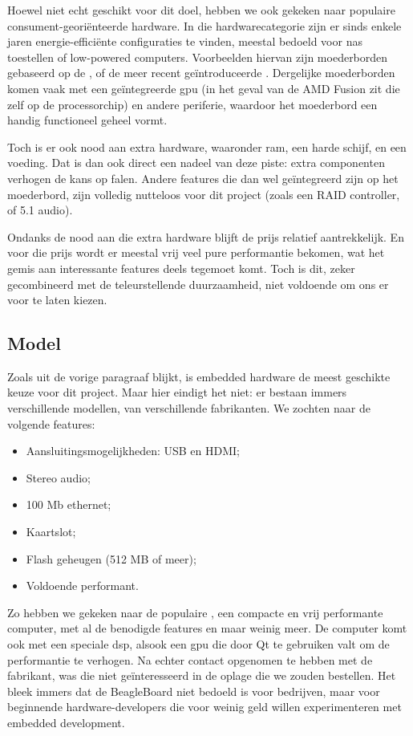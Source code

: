 Hoewel niet echt geschikt voor dit doel, hebben we ook gekeken naar populaire consument-georiënteerde hardware. In die hardwarecategorie zijn er sinds enkele jaren energie-efficiënte configuraties te vinden, meestal bedoeld voor \ac{nas} toestellen of low-powered computers. Voorbeelden hiervan zijn moederborden gebaseerd op de , of de meer recent geïntroduceerde . Dergelijke moederborden komen vaak met een geïntegreerde \ac{gpu} (in het geval van de AMD Fusion zit die zelf op de processorchip) en andere periferie, waardoor het moederbord een handig functioneel geheel vormt.

Toch is er ook nood aan extra hardware, waaronder \ac{ram}, een harde schijf, en een voeding. Dat is dan ook direct een nadeel van deze piste: extra componenten verhogen de kans op falen. Andere features die dan wel geïntegreerd zijn op het moederbord, zijn volledig nutteloos voor dit project (zoals een RAID controller, of 5.1 audio).

Ondanks de nood aan die extra hardware blijft de prijs relatief aantrekkelijk. En voor die prijs wordt er meestal vrij veel pure performantie bekomen, wat het gemis aan interessante features deels tegemoet komt. Toch is dit, zeker gecombineerd met de teleurstellende duurzaamheid, niet voldoende om ons er voor te laten kiezen.

\subsection{Model}

Zoals uit de vorige paragraaf blijkt, is embedded hardware de meest geschikte keuze voor dit project. Maar hier eindigt het niet: er bestaan immers verschillende modellen, van verschillende fabrikanten. We zochten naar de volgende features:
\begin{itemize}
\item Aansluitingsmogelijkheden: USB en HDMI;
\item Stereo audio;
\item 100 Mb ethernet;
\item Kaartslot;
\item Flash geheugen (512 MB of meer);
\item Voldoende performant.
\end{itemize}

Zo hebben we gekeken naar de populaire \textbf{}, een compacte en vrij performante computer, met al de benodigde features en maar weinig meer. De computer komt ook met een speciale \ac{dsp}, alsook een \ac{gpu} die door Qt te gebruiken valt om de performantie te verhogen. Na echter contact opgenomen te hebben met de fabrikant, was die niet geïnteresseerd in de oplage die we zouden bestellen. Het bleek immers dat de BeagleBoard niet bedoeld is voor bedrijven, maar voor beginnende hardware-developers die voor weinig geld willen experimenteren met embedded development.

